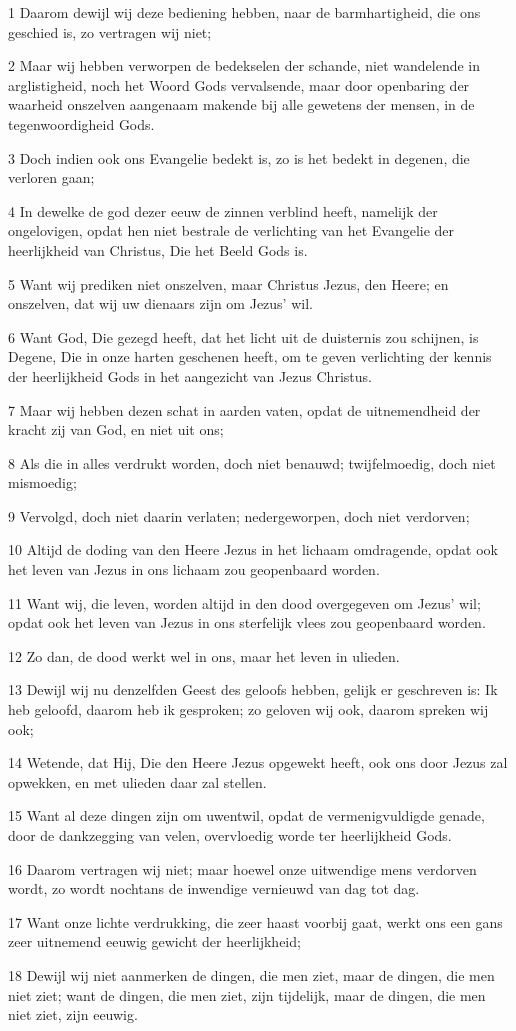 \par 1 Daarom dewijl wij deze bediening hebben, naar de barmhartigheid, die ons geschied is, zo vertragen wij niet;
\par 2 Maar wij hebben verworpen de bedekselen der schande, niet wandelende in arglistigheid, noch het Woord Gods vervalsende, maar door openbaring der waarheid onszelven aangenaam makende bij alle gewetens der mensen, in de tegenwoordigheid Gods.
\par 3 Doch indien ook ons Evangelie bedekt is, zo is het bedekt in degenen, die verloren gaan;
\par 4 In dewelke de god dezer eeuw de zinnen verblind heeft, namelijk der ongelovigen, opdat hen niet bestrale de verlichting van het Evangelie der heerlijkheid van Christus, Die het Beeld Gods is.
\par 5 Want wij prediken niet onszelven, maar Christus Jezus, den Heere; en onszelven, dat wij uw dienaars zijn om Jezus' wil.
\par 6 Want God, Die gezegd heeft, dat het licht uit de duisternis zou schijnen, is Degene, Die in onze harten geschenen heeft, om te geven verlichting der kennis der heerlijkheid Gods in het aangezicht van Jezus Christus.
\par 7 Maar wij hebben dezen schat in aarden vaten, opdat de uitnemendheid der kracht zij van God, en niet uit ons;
\par 8 Als die in alles verdrukt worden, doch niet benauwd; twijfelmoedig, doch niet mismoedig;
\par 9 Vervolgd, doch niet daarin verlaten; nedergeworpen, doch niet verdorven;
\par 10 Altijd de doding van den Heere Jezus in het lichaam omdragende, opdat ook het leven van Jezus in ons lichaam zou geopenbaard worden.
\par 11 Want wij, die leven, worden altijd in den dood overgegeven om Jezus' wil; opdat ook het leven van Jezus in ons sterfelijk vlees zou geopenbaard worden.
\par 12 Zo dan, de dood werkt wel in ons, maar het leven in ulieden.
\par 13 Dewijl wij nu denzelfden Geest des geloofs hebben, gelijk er geschreven is: Ik heb geloofd, daarom heb ik gesproken; zo geloven wij ook, daarom spreken wij ook;
\par 14 Wetende, dat Hij, Die den Heere Jezus opgewekt heeft, ook ons door Jezus zal opwekken, en met ulieden daar zal stellen.
\par 15 Want al deze dingen zijn om uwentwil, opdat de vermenigvuldigde genade, door de dankzegging van velen, overvloedig worde ter heerlijkheid Gods.
\par 16 Daarom vertragen wij niet; maar hoewel onze uitwendige mens verdorven wordt, zo wordt nochtans de inwendige vernieuwd van dag tot dag.
\par 17 Want onze lichte verdrukking, die zeer haast voorbij gaat, werkt ons een gans zeer uitnemend eeuwig gewicht der heerlijkheid;
\par 18 Dewijl wij niet aanmerken de dingen, die men ziet, maar de dingen, die men niet ziet; want de dingen, die men ziet, zijn tijdelijk, maar de dingen, die men niet ziet, zijn eeuwig.

